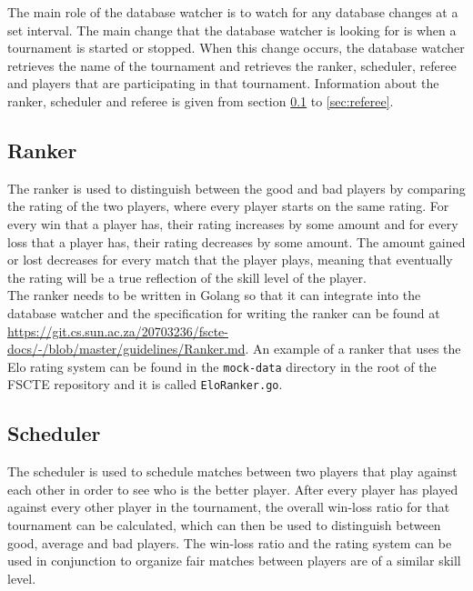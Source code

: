 \documentclass[a4paper, 12pt]{report}
\begin{document}
The main role of the database watcher is to watch for any database changes at a
set interval. The main change that the database watcher is looking for is when a
tournament is started or stopped. When this change occurs, the database watcher
retrieves the name of the tournament and retrieves the ranker, scheduler, referee
and players that are participating in that tournament. Information about the
ranker, scheduler and referee is given from section \ref{sec:ranker} to
\ref{sec:referee}.

\subsection{Ranker}
\label{sec:ranker}

The ranker is used to distinguish between the good and bad players by comparing
the rating of the two players, where every player starts on the same rating.
For every win that a player has, their rating increases by some amount and
for every loss that a player has, their rating decreases by some amount. The
amount gained or lost decreases for every match that the player plays, meaning
that eventually the rating will be a true reflection of the skill level of the
player. \\

The ranker needs to be written in Golang so that it can integrate into the database
watcher and the specification for writing the ranker can be found at
\url{https://git.cs.sun.ac.za/20703236/fscte-docs/-/blob/master/guidelines/Ranker.md}.
An example of a ranker that uses the Elo \cite{elo} rating system can be found in
the \texttt{mock-data} directory in the root of the FSCTE repository and it is
called \texttt{EloRanker.go}.

\subsection{Scheduler}
\label{sec:scheduler}

The scheduler is used to schedule matches between two players that play against
each other in order to see who is the better player. After every player
has played against every other player in the tournament, the overall win-loss
ratio for that tournament can be calculated, which can then be used to
distinguish between good, average and bad players. The win-loss ratio and the
rating system can be used in conjunction to organize fair matches between players
are of a similar skill level. \\
\end{document}
